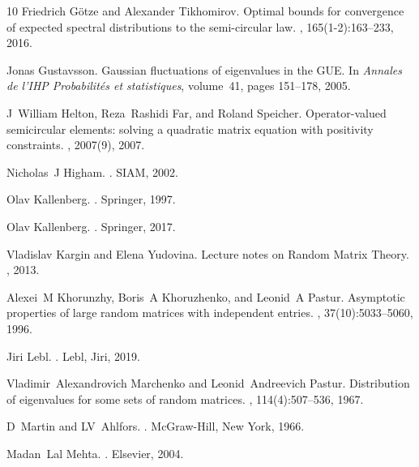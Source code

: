 \documentclass[11pt, a4paper, oneside]{book}
\numberwithin{equation}{chapter}
\begin{document}
\begin{thebibliography}{10}
Friedrich G{\"o}tze and Alexander Tikhomirov.
\newblock Optimal bounds for convergence of expected spectral distributions to the semi-circular law.
, 165(1-2):163--233, 2016.

Jonas Gustavsson.
\newblock Gaussian fluctuations of eigenvalues in the {GUE}.
\newblock In {\em Annales de l'IHP Probabilit{\'e}s et statistiques}, volume~41, pages 151--178, 2005.

J~William Helton, Reza~Rashidi Far, and Roland Speicher.
\newblock Operator-valued semicircular elements: solving a quadratic matrix equation with positivity constraints.
, 2007(9), 2007.

Nicholas~J Higham.
.
\newblock SIAM, 2002.

Olav Kallenberg.
.
\newblock Springer, 1997.

Olav Kallenberg.
.
\newblock Springer, 2017.

Vladislav Kargin and Elena Yudovina.
\newblock Lecture notes on {R}andom {M}atrix {T}heory.
, 2013.

Alexei~M Khorunzhy, Boris~A Khoruzhenko, and Leonid~A Pastur.
\newblock Asymptotic properties of large random matrices with independent entries.
, 37(10):5033--5060, 1996.

Jiri Lebl.
.
\newblock Lebl, Jiri, 2019.

Vladimir~Alexandrovich Marchenko and Leonid~Andreevich Pastur.
\newblock Distribution of eigenvalues for some sets of random matrices.
, 114(4):507--536, 1967.

D~Martin and LV~Ahlfors.
.
\newblock McGraw-Hill, New York, 1966.

Madan~Lal Mehta.
.
\newblock Elsevier, 2004.


\end{thebibliography}
\end{document}
